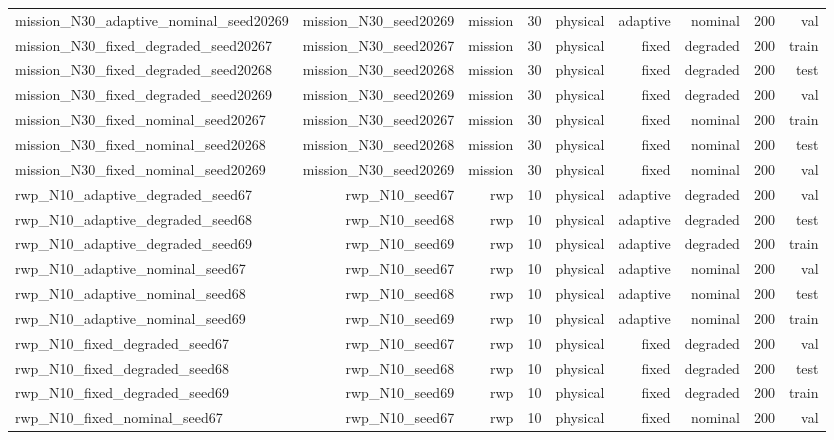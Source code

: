\begin{tabular}{lrrrrrrrr}
mission\_N30\_adaptive\_nominal\_seed20269 & mission\_N30\_seed20269 & mission & 30 & physical & adaptive & nominal & 200 & val \\
mission\_N30\_fixed\_degraded\_seed20267 & mission\_N30\_seed20267 & mission & 30 & physical & fixed & degraded & 200 & train \\
mission\_N30\_fixed\_degraded\_seed20268 & mission\_N30\_seed20268 & mission & 30 & physical & fixed & degraded & 200 & test \\
mission\_N30\_fixed\_degraded\_seed20269 & mission\_N30\_seed20269 & mission & 30 & physical & fixed & degraded & 200 & val \\
mission\_N30\_fixed\_nominal\_seed20267 & mission\_N30\_seed20267 & mission & 30 & physical & fixed & nominal & 200 & train \\
mission\_N30\_fixed\_nominal\_seed20268 & mission\_N30\_seed20268 & mission & 30 & physical & fixed & nominal & 200 & test \\
mission\_N30\_fixed\_nominal\_seed20269 & mission\_N30\_seed20269 & mission & 30 & physical & fixed & nominal & 200 & val \\
rwp\_N10\_adaptive\_degraded\_seed67 & rwp\_N10\_seed67 & rwp & 10 & physical & adaptive & degraded & 200 & val \\
rwp\_N10\_adaptive\_degraded\_seed68 & rwp\_N10\_seed68 & rwp & 10 & physical & adaptive & degraded & 200 & test \\
rwp\_N10\_adaptive\_degraded\_seed69 & rwp\_N10\_seed69 & rwp & 10 & physical & adaptive & degraded & 200 & train \\
rwp\_N10\_adaptive\_nominal\_seed67 & rwp\_N10\_seed67 & rwp & 10 & physical & adaptive & nominal & 200 & val \\
rwp\_N10\_adaptive\_nominal\_seed68 & rwp\_N10\_seed68 & rwp & 10 & physical & adaptive & nominal & 200 & test \\
rwp\_N10\_adaptive\_nominal\_seed69 & rwp\_N10\_seed69 & rwp & 10 & physical & adaptive & nominal & 200 & train \\
rwp\_N10\_fixed\_degraded\_seed67 & rwp\_N10\_seed67 & rwp & 10 & physical & fixed & degraded & 200 & val \\
rwp\_N10\_fixed\_degraded\_seed68 & rwp\_N10\_seed68 & rwp & 10 & physical & fixed & degraded & 200 & test \\
rwp\_N10\_fixed\_degraded\_seed69 & rwp\_N10\_seed69 & rwp & 10 & physical & fixed & degraded & 200 & train \\
rwp\_N10\_fixed\_nominal\_seed67 & rwp\_N10\_seed67 & rwp & 10 & physical & fixed & nominal & 200 & val \\

\end{tabular}
